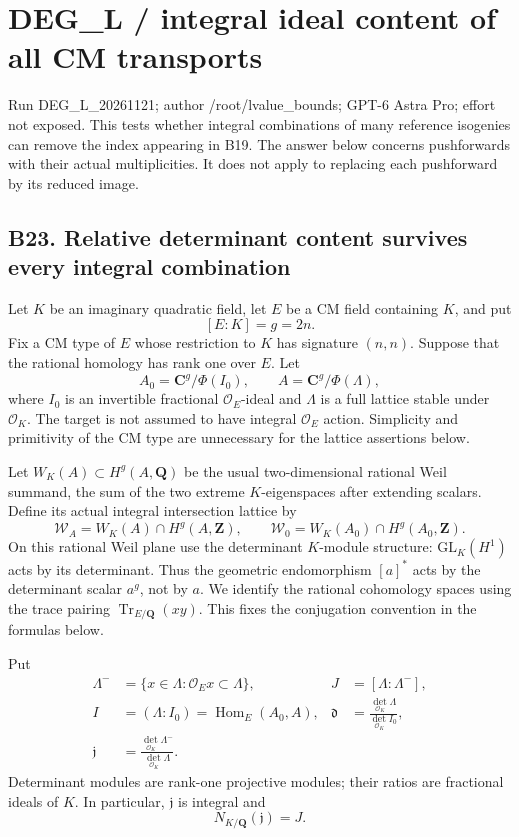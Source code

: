 \providecommand{\tightlist}{\setlength{\itemsep}{0pt}\setlength{\parskip}{0pt}}
\section{DEG\_L / integral ideal content of all CM transports}\label{deg_l-integral-ideal-content-of-all-cm-transports}

Run DEG\_L\_20261121; author /root/lvalue\_bounds; GPT-6 Astra Pro; effort not exposed. This tests whether integral combinations of many reference isogenies can remove the index appearing in B19. The answer below concerns pushforwards with their actual multiplicities. It does not apply to replacing each pushforward by its reduced image.

\subsection{B23. Relative determinant content survives every integral combination}\label{b23.-relative-determinant-content-survives-every-integral-combination}

Let \(K\) be an imaginary quadratic field, let \(E\) be a CM field containing \(K\), and put \[
 [E:K]=g=2n.
\] Fix a CM type of \(E\) whose restriction to \(K\) has signature \((n,n)\). Suppose that the rational homology has rank one over \(E\). Let \[
 A_0=\mathbf C^g/\Phi(I_0),\qquad
 A=\mathbf C^g/\Phi(\Lambda),
\] where \(I_0\) is an invertible fractional \(\mathcal O_E\)-ideal and \(\Lambda\) is a full lattice stable under \(\mathcal O_K\). The target is not assumed to have integral \(\mathcal O_E\) action. Simplicity and primitivity of the CM type are unnecessary for the lattice assertions below.

Let \(W_K(A)\subset H^g(A,\mathbf Q)\) be the usual two-dimensional rational Weil summand, the sum of the two extreme \(K\)-eigenspaces after extending scalars. Define its actual integral intersection lattice by \[
 \mathscr W_A=W_K(A)\cap H^g(A,\mathbf Z),
 \qquad
 \mathscr W_0=W_K(A_0)\cap H^g(A_0,\mathbf Z).
\tag{B23.1}
\] On this rational Weil plane use the determinant \(K\)-module structure: \(\mathrm{GL}_K(H^1)\) acts by its determinant. Thus the geometric endomorphism \([a]^*\) acts by the determinant scalar \(a^g\), not by \(a\). We identify the rational cohomology spaces using the trace pairing \(\operatorname{Tr}_{E/\mathbf Q}(xy)\). This fixes the conjugation convention in the formulas below.

Put \[
 \begin{aligned}
 \Lambda^-&=\{x\in\Lambda:\mathcal O_E x\subset\Lambda\},
 &J&=[\Lambda:\Lambda^-],\\
 I&=(\Lambda:I_0)=\operatorname{Hom}_E(A_0,A),
 &\mathfrak d&=\frac{\det_{\mathcal O_K}\Lambda}
                       {\det_{\mathcal O_K}I_0},\\
 \mathfrak j&=\frac{\det_{\mathcal O_K}\Lambda^-}
                       {\det_{\mathcal O_K}\Lambda}.
 \end{aligned}
\tag{B23.2}
\] Determinant modules are rank-one projective modules; their ratios are fractional ideals of \(K\). In particular, \(\mathfrak j\) is integral and \[
 N_{K/\mathbf Q}(\mathfrak j)=J.
\]

